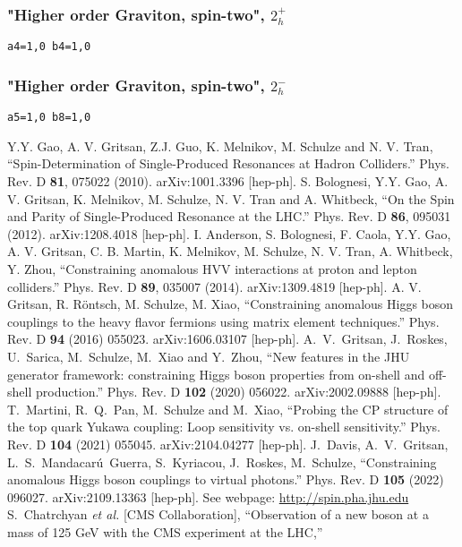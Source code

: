 \documentclass[aps,superscriptaddress,nofootinbib]{revtex4}
\begin{document}
\subsubsection{"Higher order Graviton, spin-two", \texorpdfstring{$2^+_h$}{2+h}}
\verb|a4=1,0 b4=1,0|
\subsubsection{"Higher order Graviton, spin-two", \texorpdfstring{$2^-_h$}{2-h}}
\verb|a5=1,0 b8=1,0|
\begin{thebibliography}{99}
Y.Y. Gao, A. V. Gritsan, Z.J. Guo, K. Melnikov, M. Schulze and N. V. Tran, ``Spin-Determination of Single-Produced Resonances at Hadron Colliders.'' Phys. Rev. D \textbf{81}, 075022 (2010). arXiv:1001.3396 [hep-ph].
S. Bolognesi, Y.Y. Gao, A. V. Gritsan, K. Melnikov, M. Schulze, N. V. Tran and A. Whitbeck, ``On the Spin and Parity of Single-Produced Resonance at the LHC.'' Phys. Rev. D \textbf{86}, 095031 (2012). arXiv:1208.4018 [hep-ph].
I. Anderson, S. Bolognesi, F. Caola, Y.Y. Gao, A. V. Gritsan, C. B. Martin, K. Melnikov, M. Schulze, N. V. Tran, A. Whitbeck, Y. Zhou, ``Constraining anomalous HVV interactions at proton and lepton colliders.'' Phys. Rev. D \textbf{89}, 035007 (2014). arXiv:1309.4819 [hep-ph].
A. V. Gritsan, R. R\"ontsch, M. Schulze, M. Xiao, ``Constraining anomalous Higgs boson couplings to the heavy flavor fermions using matrix element techniques.'' Phys. Rev. D \textbf{94} (2016) 055023. arXiv:1606.03107 [hep-ph].
 A.~V.~Gritsan, J.~Roskes, U.~Sarica, M.~Schulze, M.~Xiao and Y.~Zhou, ``New features in the JHU generator framework: 
 constraining Higgs boson properties from on-shell and off-shell production.'' 
 Phys. Rev. D \textbf{102} (2020) 056022. arXiv:2002.09888 [hep-ph].
T.~Martini, R.~Q.~Pan, M.~Schulze and M.~Xiao,
``Probing the CP structure of the top quark Yukawa coupling: Loop sensitivity vs. on-shell sensitivity.''
Phys. Rev. D \textbf{104} (2021) 055045. arXiv:2104.04277 [hep-ph].
J.~Davis, A.~V.~Gritsan, L.~S.~Mandacar\'{u}~Guerra, S.~Kyriacou, J.~Roskes, M.~Schulze, ``Constraining anomalous Higgs boson couplings to virtual photons.'' 
 Phys. Rev. D \textbf{105} (2022) 096027. arXiv:2109.13363 [hep-ph].
See webpage: \url{http://spin.pha.jhu.edu}
  S.~Chatrchyan {\it et al.}  [CMS Collaboration],
  ``Observation of a new boson at a mass of 125 GeV with the CMS experiment at the LHC,''

\end{thebibliography}
\end{document}
